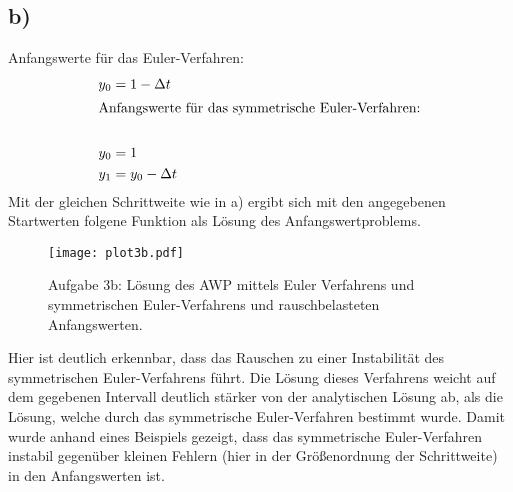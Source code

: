 \subsection*{b)}
Anfangswerte für das Euler-Verfahren:
\begin{align*}
  y_0&=1-\Delta t\\
  \intertext{Anfangswerte für das symmetrische Euler-Verfahren:}\\
  y_0&=1\\
  y_1&=y_0-\Delta t
\end{align*}
Mit der gleichen Schrittweite wie in a) ergibt sich mit den angegebenen Startwerten folgene Funktion als Lösung des Anfangswertproblems.
\FloatBarrier
\begin{figure}[h]
    \centering
    \texttt{[image: plot3b.pdf]}
    \caption{Aufgabe 3b: Lösung des AWP mittels Euler Verfahrens und symmetrischen Euler-Verfahrens und rauschbelasteten Anfangswerten.}
    \label{fig:plot3a}
\end{figure}
\FloatBarrier
Hier ist deutlich erkennbar, dass das Rauschen zu einer Instabilität des symmetrischen Euler-Verfahrens führt. Die Lösung dieses Verfahrens weicht auf dem gegebenen Intervall deutlich stärker von der analytischen Lösung ab, als die Lösung, welche durch das symmetrische Euler-Verfahren bestimmt wurde. Damit wurde anhand eines Beispiels gezeigt, dass das symmetrische Euler-Verfahren instabil gegenüber kleinen Fehlern (hier in der Größenordnung der Schrittweite) in den Anfangswerten ist.

